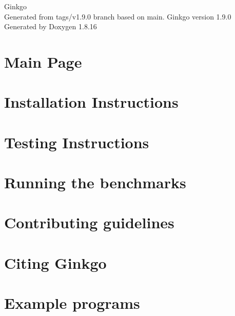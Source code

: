 \let\mypdfximage\pdfximage\def\pdfximage{\immediate\mypdfximage}\documentclass[twoside]{book}
\newcommand{\+}{\discretionary{\mbox{\scriptsize$\hookleftarrow$}}{}{}}
\newcommand{\clearemptydoublepage}{%
  \newpage{\pagestyle{empty}\cleardoublepage}%
}
\begin{document}
\hypersetup{pageanchor=false,
             bookmarksnumbered=true,
             pdfencoding=unicode
            }
\begin{titlepage}
\vspace*{7cm}
\begin{center}%
{\Large Ginkgo \\[1ex]\large Generated from tags/v1.\+9.\+0 branch based on main. Ginkgo version 1.\+9.\+0 }\\
\vspace*{1cm}
{\large Generated by Doxygen 1.8.16}\\
\end{center}
\end{titlepage}
\clearemptydoublepage
{}
\tableofcontents
\clearemptydoublepage
{}
\hypersetup{pageanchor=true}

\chapter{Main Page}
\label{index}\hypertarget{index}{}
\chapter{Installation Instructions}
\label{install_ginkgo}

\chapter{Testing Instructions}
\label{testing_ginkgo}

\chapter{Running the benchmarks}
\label{benchmarking_ginkgo}

\chapter{Contributing guidelines}
\label{contributing_guidelines}

\chapter{Citing Ginkgo}
\label{citing_ginkgo}

\chapter{Example programs}
\label{Examples}

\end{document}
